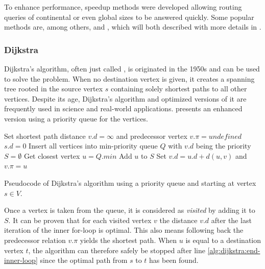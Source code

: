 		To enhance performance, speedup methods were developed allowing routing queries of continental or even global sizes to be answered quickly.
		Some popular methods are, among others,  and , which will both described with more details in .
		
		\subsubsection{Dijkstra}
		\label{subsubsec:dijkstra}
		
			Dijkstra's algorithm, often just called , is originated in the 1950s and can be used to solve the  problem.
			When no destination vertex is given, it creates a spanning tree rooted in the source vertex $s$ containing solely shortest paths to all other vertices.
			Despite its age, Dijkstra's algorithm and optimized versions of it are frequently used in science and real-world applications.
			 presents an enhanced version using a priority queue for the vertices\cite[658]{cormen-introduction-to-alg}.
			
			\begin{algorithm}[h]
				\begin{algorithmic}[1]
						\State Set shortest path distance $v.d = \infty$ and predecessor vertex $v.\pi = undefined$
					\EndFor
					\State $s.d = 0$
					\State Insert all vertices into min-priority queue $Q$ with $v.d$ being the priority
					\State $S = \emptyset$
						\State Get closest vertex $u = Q.min$
							\State Add $u$ to $S$
								\State Set $v.d = u.d + d(u, v)$ and $v.\pi = u$
							\EndIf
						\EndFor \label{alg:dijkstra:end-inner-loop}
					\EndWhile
				\end{algorithmic}
				\caption{Pseudocode of Dijkstra's algorithm using a priority queue and starting at vertex $s \in V$.}
				\label{alg:dijkstra}
			\end{algorithm}
			\noindent
			Once a vertex is taken from the queue, it is considered as \emph{visited} by adding it to $S$.
			It can be proven that for each visited vertex $v$ the distance $v.d$ after the last iteration of the inner for-loop is optimal\cite[659-661]{cormen-introduction-to-alg}.
			This also means following back the predecessor relation $v.\pi$ yields the shortest path.
			When $u$ is equal to a destination vertex $t$, the algorithm can therefore safely be stopped after line \ref{alg:dijkstra:end-inner-loop} since the optimal path from $s$ to $t$ has been found.
		
